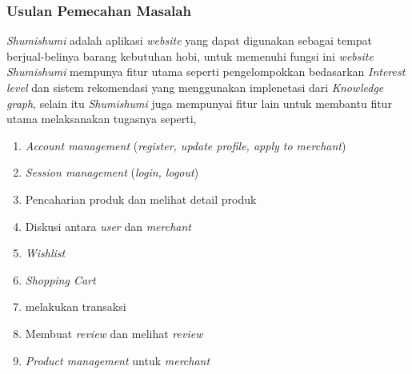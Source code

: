 \documentclass[a4paper]{article}
\newcommand{\subsubbab}[1]{%
    \subsubsection{#1}%
}
\begin{document}
\subsubbab{Usulan Pemecahan Masalah}

\textit{Shumishumi} adalah aplikasi \textit{website} yang dapat digunakan sebagai tempat berjual-belinya barang kebutuhan hobi, untuk memenuhi fungsi ini \textit{website Shumishumi} mempunya fitur utama seperti pengelompokkan bedasarkan \textit{Interest level} dan sistem rekomendasi yang menggunakan implenetasi dari \textit{Knowledge graph}, selain itu \textit{Shumishumi} juga mempunyai fitur lain untuk membantu fitur utama melaksanakan tugasnya seperti,
\begin{enumerate}
    \item \textit{Account management} (\textit{register, update profile, apply to merchant})
    \item \textit{Session management} (\textit{login, logout})
    \item Pencaharian produk dan melihat detail produk
    \item Diskusi antara \textit{user} dan \textit{merchant}
    \item \textit{Wishlist}
    \item \textit{Shopping Cart}
    \item melakukan transaksi
    \item Membuat \textit{review} dan melihat \textit{review}
    \item \textit{Product management} untuk \textit{merchant}
\end{enumerate}
\end{document}
